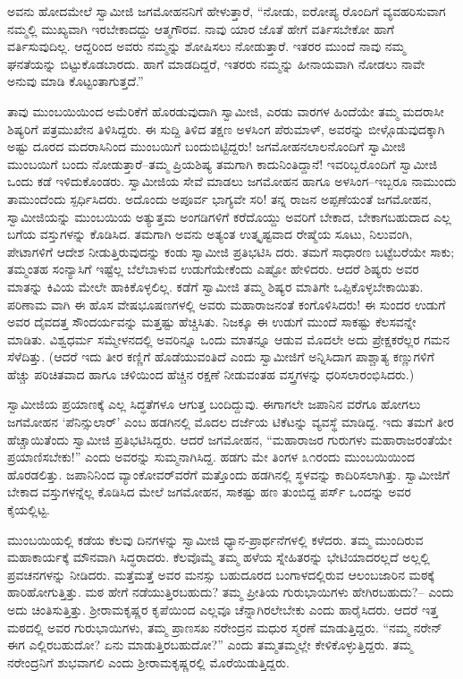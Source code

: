 ಅವನು ಹೋದಮೇಲೆ ಸ್ವಾಮೀಜಿ ಜಗಮೋಹನನಿಗೆ ಹೇಳುತ್ತಾರೆ, “ನೋಡು, ಐರೋಪ್ಯ ರೊಂದಿಗೆ ವ್ಯವಹರಿಸುವಾಗ ನಮ್ಮಲ್ಲಿ ಮುಖ್ಯವಾಗಿ ಇರಬೇಕಾದದ್ದು ಆತ್ಮಗೌರವ. ನಾವು ಯಾರ ಜೊತೆ ಹೇಗೆ ವರ್ತಿಸಬೇಕೋ ಹಾಗೆ ವರ್ತಿಸುವುದಿಲ್ಲ. ಆದ್ದರಿಂದ ಅವರು ನಮ್ಮನ್ನು ಶೋಷಿಸಲು ನೋಡುತ್ತಾರೆ. ಇತರರ ಮುಂದೆ ನಾವು ನಮ್ಮ ಘನತೆಯನ್ನು ಬಿಟ್ಟುಕೊಡಬಾರದು. ಹಾಗೆ ಮಾಡದಿದ್ದರೆ, ಇತರರು ನಮ್ಮನ್ನು ಹೀನಾಯವಾಗಿ ನೋಡಲು ನಾವೇ ಅನುವು ಮಾಡಿ ಕೊಟ್ಟಂತಾಗುತ್ತದೆ.”

ತಾವು ಮುಂಬಯಿಯಿಂದ ಅಮೆರಿಕೆಗೆ ಹೊರಡುವುದಾಗಿ ಸ್ವಾಮೀಜಿ, ಎರಡು ವಾರಗಳ ಹಿಂದೆಯೇ ತಮ್ಮ ಮದರಾಸೀ ಶಿಷ್ಯರಿಗೆ ಪತ್ರಮುಖೇನ ತಿಳಿಸಿದ್ದರು. ಈ ಸುದ್ದಿ ತಿಳಿದ ತಕ್ಷಣ ಅಳಸಿಂಗ ಪೆರುಮಾಳ್, ಅವರನ್ನು ಬೀಳ್ಗೊಡುವುದಕ್ಕಾಗಿ ಅಷ್ಟು ದೂರದ ಮದರಾಸಿನಿಂದ ಮುಂಬಯಿಗೆ ಬಂದುಬಿಟ್ಟಿದ್ದರು! ಜಗಮೋಹನಲಾಲನೊಂದಿಗೆ ಸ್ವಾಮೀಜಿ ಮುಂಬಯಿಗೆ ಬಂದು ನೋಡುತ್ತಾರೆ–ತಮ್ಮ ಪ್ರಿಯಶಿಷ್ಯ ತಮಗಾಗಿ ಕಾದುನಿಂತಿದ್ದಾನೆ! ಇವರಿಬ್ಬರೊಂದಿಗೆ ಸ್ವಾಮೀಜಿ ಒಂದು ಕಡೆ ಇಳಿದುಕೊಂಡರು. ಸ್ವಾಮೀಜಿಯ ಸೇವೆ ಮಾಡಲು ಜಗಮೋಹನ ಹಾಗೂ ಅಳಸಿಂಗ–ಇಬ್ಬರೂ ನಾಮುಂದು ತಾಮುಂದೆಂದು ಸ್ಪರ್ಧಿಸಿದರು. ಅದೊಂದು ಅಪೂರ್ವ ಭಾಗ್ಯವೇ ಸರಿ! ತನ್ನ ರಾಜನ ಅಪ್ಪಣೆಯಂತೆ ಜಗಮೋಹನ, ಸ್ವಾಮೀಜಿಯನ್ನು ಮುಂಬಯಿಯ ಅತ್ಯುತ್ತಮ ಅಂಗಡಿಗಳಿಗೆ ಕರೆದೊಯ್ದು ಅವರಿಗೆ ಬೇಕಾದ, ಬೇಕಾಗಬಹುದಾದ ಎಲ್ಲ ಬಗೆಯ ವಸ್ತುಗಳನ್ನು ಕೊಡಿಸಿದ. ತಮಗಾಗಿ ಅವನು ಅತ್ಯಂತ ಉತ್ಕೃಷ್ಟವಾದ ರೇಷ್ಮೆಯ ಸೂಟು, ನಿಲುವಂಗಿ, ಪೇಟಾಗಳಿಗೆ ಆದೇಶ ನೀಡುತ್ತಿರುವುದನ್ನು ಕಂಡು ಸ್ವಾಮೀಜಿ ಪ್ರತಿಭಟಿಸಿ ದರು. ತಮಗೆ ಸಾಧಾರಣ ಬಟ್ಟೆಬರೆಯೇ ಸಾಕು; ತಮ್ಮಂತಹ ಸಂನ್ಯಾಸಿಗೆ ಇಷ್ಟೆಲ್ಲ ಬೆಲೆಬಾಳುವ ಉಡುಗೆಯೇಕೆಂದು ಎಷ್ಟೋ ಹೇಳಿದರು. ಆದರೆ ಶಿಷ್ಯರು ಅವರ ಮಾತನ್ನು ಕಿವಿಯ ಮೇಲೇ ಹಾಕಿಕೊಳ್ಳಲಿಲ್ಲ. ಕಡೆಗೆ ಸ್ವಾಮೀಜಿ ತಮ್ಮ ಶಿಷ್ಯರ ಮಾತಿಗೇ ಒಪ್ಪಿಕೊಳ್ಳಬೇಕಾಯಿತು. ಪರಿಣಾಮ ವಾಗಿ ಈ ಹೊಸ ವೇಷಭೂಷಣಗಳಲ್ಲಿ ಅವರು ಮಹಾರಾಜನಂತೆ ಕಂಗೊಳಿಸಿದರು! ಈ ಸುಂದರ ಉಡುಗೆ ಅವರ ದೈವದತ್ತ ಸೌಂದರ್ಯವನ್ನು ಮತ್ತಷ್ಟು ಹೆಚ್ಚಿಸಿತು. ನಿಜಕ್ಕೂ ಈ ಉಡುಗೆ ಮುಂದೆ ಸಾಕಷ್ಟು ಕೆಲಸವನ್ನೇ ಮಾಡಿತು. ವಿಶ್ವಧರ್ಮ ಸಮ್ಮೇಳನದಲ್ಲಿ ಅವರಿನ್ನೂ ಒಂದು ಮಾತನ್ನೂ ಆಡುವ ಮೊದಲೇ ಅದು ಪ್ರೇಕ್ಷಕರೆಲ್ಲರ ಗಮನ ಸೆಳೆದಿತ್ತು. (ಆದರೆ ಇದು ತೀರ ಕಣ್ಣಿಗೆ ಹೊಡೆಯುವಂತಿದೆ ಎಂದು ಸ್ವಾಮೀಜಿಗೆ ಅನ್ನಿಸಿದಾಗ ಪಾಶ್ಚಾತ್ಯ ಕಣ್ಣುಗಳಿಗೆ ಹೆಚ್ಚು ಪರಿಚಿತವಾದ ಹಾಗೂ ಚಳಿಯಿಂದ ಹೆಚ್ಚಿನ ರಕ್ಷಣೆ ನೀಡುವಂತಹ ವಸ್ತ್ರಗಳನ್ನು ಧರಿಸಲಾರಂಭಿಸಿದರು.)

ಸ್ವಾಮೀಜಿಯ ಪ್ರಯಾಣಕ್ಕೆ ಎಲ್ಲ ಸಿದ್ಧತೆಗಳೂ ಆಗುತ್ತ ಬಂದಿದ್ದುವು. ಈಗಾಗಲೇ ಜಪಾನಿನ ವರೆಗೂ ಹೋಗಲು ಜಗಮೋಹನ ‘ಪೆನಿನ್ಸುಲಾರ್​’ ಎಂಬ ಹಡಗಿನಲ್ಲಿ ಮೊದಲ ದರ್ಜೆಯ ಟಿಕೆಟನ್ನು ವ್ಯವಸ್ಥೆ ಮಾಡಿದ್ದ. ಇದು ತಮಗೆ ತೀರ ಹೆಚ್ಚಾಯಿತೆಂದು ಸ್ವಾಮೀಜಿ ಪ್ರತಿಭಟಿಸಿದ್ದರು. ಆದರೆ ಜಗಮೋಹನ, “ಮಹಾರಾಜರ ಗುರುಗಳು ಮಹಾರಾಜರಂತೆಯೇ ಪ್ರಯಾಣಿಸಬೇಕು!” ಎಂದು ಅವರನ್ನು ಸುಮ್ಮನಾಗಿಸಿದ್ದ. ಹಡಗು ಮೇ ತಿಂಗಳ ೩೧ರಂದು ಮುಂಬಯಿಯಿಂದ ಹೊರಡಲಿತ್ತು. ಜಪಾನಿನಿಂದ ವ್ಯಾಂಕೋವರ್​ವರೆಗೆ ಮತ್ತೊಂದು ಹಡಗಿನಲ್ಲಿ ಸ್ಥಳವನ್ನು ಕಾದಿರಿಸಲಾಗಿತ್ತು. ಸ್ವಾಮೀಜಿಗೆ ಬೇಕಾದ ವಸ್ತುಗಳನ್ನೆಲ್ಲ ಕೊಡಿಸಿದ ಮೇಲೆ ಜಗಮೋಹನ, ಸಾಕಷ್ಟು ಹಣ ತುಂಬಿದ್ದ ಪರ್ಸ್ ಒಂದನ್ನು ಅವರ ಕೈಯಲ್ಲಿಟ್ಟ.

ಮುಂಬಯಿಯಲ್ಲಿ ಕಡೆಯ ಕೆಲವು ದಿನಗಳನ್ನು ಸ್ವಾಮೀಜಿ ಧ್ಯಾನ-ಪ್ರಾರ್ಥನೆಗಳಲ್ಲಿ ಕಳೆದರು. ತಮ್ಮ ಮುಂದಿರುವ ಮಹಾಕಾರ್ಯಕ್ಕೆ ಮೌನವಾಗಿ ಸಿದ್ಧರಾದರು. ಕೆಲವೊಮ್ಮೆ ತಮ್ಮ ಹಳೆಯ ಸ್ನೇಹಿತರನ್ನು ಭೇಟಿಯಾದರಲ್ಲದೆ ಅಲ್ಲಲ್ಲಿ ಪ್ರವಚನಗಳನ್ನು ನೀಡಿದರು. ಮತ್ತೆಮತ್ತೆ ಅವರ ಮನಸ್ಸು ಬಹುದೂರದ ಬಂಗಾಳದಲ್ಲಿರುವ ಆಲಂಬಜಾರಿನ ಮಠಕ್ಕೆ ಹಾರಿಹೋಗುತ್ತಿತ್ತು. ಮಠ ಹೇಗೆ ನಡೆಯುತ್ತಿರಬಹುದು? ತಮ್ಮ ಪ್ರೀತಿಯ ಗುರುಭಾಯಿಗಳು ಹೇಗಿರಬಹುದು?– ಎಂದು ಅದು ಚಿಂತಿಸುತ್ತಿತ್ತು. ಶ್ರೀರಾಮಕೃಷ್ಣರ ಕೃಪೆಯಿಂದ ಎಲ್ಲವೂ ಚೆನ್ನಾಗಿರಲೇಬೇಕು ಎಂದು ಹಾರೈಸಿದರು. ಆದರೆ ಇತ್ತ ಮಠದಲ್ಲಿ ಅವರ ಗುರುಭಾಯಿಗಳು, ತಮ್ಮ ಪ್ರಾಣಸಖ ನರೇಂದ್ರನ ಮಧುರ ಸ್ಮರಣೆ ಮಾಡುತ್ತಿದ್ದರು. “ನಮ್ಮ ನರೇನ್ ಈಗ ಎಲ್ಲಿರಬಹುದೋ? ಏನು ಮಾಡುತ್ತಿರಬಹುದೋ?” ಎಂದು ತಮ್ಮತಮ್ಮಲ್ಲೇ ಕೇಳಿಕೊಳ್ಳುತ್ತಿದ್ದರು. ತಮ್ಮ ನರೇಂದ್ರನಿಗೆ ಶುಭವಾಗಲಿ ಎಂದು ಶ್ರೀರಾಮಕೃಷ್ಣರಲ್ಲಿ ಮೊರೆಯಿಡುತ್ತಿದ್ದರು.

